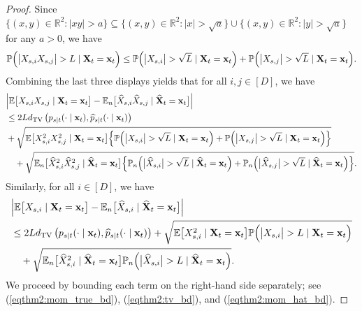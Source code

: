 \documentclass[11pt,a4paper,final]{article}
\numberwithin{equation}{section}
\theoremstyle{remark}
\newcommand{\bx}{{\bf x}}
\newcommand{\bX}{{\bf X}}
\newcommand{\bbE}{{\mathbb E}}
\newcommand{\bbR}{{\mathbb R}}
\newcommand{\bbP}{{\mathbb P}}
\newcommand{\be}{\begin{equation}}
\newcommand{\ee}{\end{equation}}
\newcommand{\bean}{\setlength\arraycolsep{1pt}\begin{eqnarray*}}
\newcommand{\eean}{\end{eqnarray*}}
\begin{document}
\begin{proof}
Since $\{ (x,y) \in \bbR^{2} : \vert xy \vert > a \} \subseteq \{ (x,y) \in \bbR^2 : \vert x \vert > \sqrt{a} \} \cup \{ (x,y) \in \bbR^2 :  \vert y \vert > \sqrt{a} \}  $ for any $a > 0$, we have
\bean
\bbP \Big(
\big\vert   X_{s,i}  X_{s,j}   \big\vert > L \mid  \bX_{t} = \bx_{t} 
\Big) 
\leq
\bbP \Big(
\big\vert   X_{s,i}  \big\vert > \sqrt{L} \mid  \bX_{t} = \bx_{t} 
\Big)
+
\bbP \Big(
\big\vert   X_{s,j}  \big\vert > \sqrt{L} \mid  \bX_{t} = \bx_{t} 
\Big).
\eean
Combining the last three displays yields that for all $i,j \in [D]$, we have
\be
\begin{split}
& \Big\vert \bbE \big[  X_{s,i}  X_{s ,j} \mid  \bX_{t} = \bx_{t} \big] - \bbE_n \big[ \widehat X_{s,i} \widehat X_{s ,j} \mid \widehat \bX_{t} = \bx_{t} \big]  \Big\vert
\\
& \leq 2 L d_{\rm TV} \left( p_{s \mid t}(\cdot \mid \bx_{t} ), \widehat p_{s \mid t}(\cdot \mid \bx_{t} ) \right) 
\\
& + \sqrt{ \bbE \big[ X_{s,i}^2 X_{s,j}^2 \mid \bX_{t} = \bx_{t} \big]  \Big\{  \bbP \Big(
\big\vert   X_{s,i}  \big\vert > \sqrt{L} \mid  \bX_{t} = \bx_{t} 
\Big)
+ \bbP \Big(
\big\vert   X_{s,j}  \big\vert > \sqrt{L} \mid  \bX_{t} = \bx_{t}
\Big) \Big\} } 
\\
& \quad + \sqrt{ \bbE_{n} \big[ \widehat X_{s,i}^2 \widehat X_{s,j}^2 \mid \widehat \bX_{t} = \bx_{t} \big]  \Big\{  \bbP_{n} \Big(
\big\vert \widehat  X_{s,i}  \big\vert > \sqrt{L} \mid \widehat \bX_{t} = \bx_{t} 
\Big)
+ \bbP_{n} \Big(
\big\vert  \widehat X_{s,j}  \big\vert > \sqrt{L} \mid \widehat \bX_{t} = \bx_{t}
\Big) \Big\} }.
\label{eqthm2:tot_sec_mom_bd}
\end{split}
\ee
Similarly, for all $i\in [D]$, we have
\be
\begin{split}
& \Big\vert \bbE \big[  X_{s,i}  \mid  \bX_{t} = \bx_{t} \big] - \bbE_n \big[ \widehat X_{s,i}  \mid \widehat \bX_{t} = \bx_{t} \big]  \Big\vert
\\
& \leq 2 L d_{\rm TV} \left( p_{s \mid t}(\cdot \mid \bx_{t} ), \widehat p_{s \mid t}(\cdot \mid \bx_{t} ) \right) 
+ \sqrt{ \bbE \big[ X_{s,i}^2 \mid \bX_{t} = \bx_{t} \big]  \bbP \Big(
\big\vert   X_{s,i}  \big\vert > L \mid  \bX_{t} = \bx_{t} 
\Big) } 
\\
& \quad + \sqrt{ \bbE_{n} \big[  \widehat X_{s,i}^2 \mid \widehat \bX_{t} = \bx_{t} \big]  \bbP_{n} \Big(
\big\vert  \widehat  X_{s,i}  \big\vert > L \mid \widehat  \bX_{t} = \bx_{t} 
\Big) }.
\label{eqthm2:tot_fir_mom_bd}
\end{split}
\ee
We proceed by bounding each term on the right-hand side separately; see (\ref{eqthm2:mom_true_bd}), (\ref{eqthm2:tv_bd}), and (\ref{eqthm2:mom_hat_bd}).


\end{proof}
\end{document}

